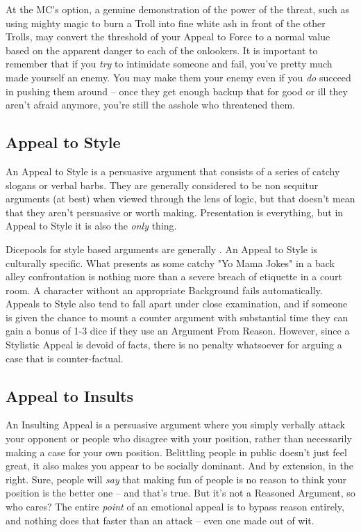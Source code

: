 At the MC's option, a genuine demonstration of the power of the threat, such as using mighty magic to burn a Troll into fine white ash in front of the other Trolls, may convert the threshold of your Appeal to Force to a normal value based on the apparent danger to each of the onlookers. It is important to remember that if you \textit{try} to intimidate someone and fail, you've pretty much made yourself an enemy. You may make them your enemy even if you \textit{do} succeed in pushing them around -- once they get enough backup that for good or ill they aren't afraid anymore, you're still the asshole who threatened them.

\subsection{Appeal to Style}

An Appeal to Style is a persuasive argument that consists of a series of catchy slogans or verbal barbs. They are generally considered to be non sequitur arguments (at best) when viewed through the lens of logic, but that doesn't mean that they aren't persuasive or worth making. Presentation is everything, but in Appeal to Style it is also the \textit{only} thing.

Dicepools for style based arguments are generally . An Appeal to Style is culturally specific. What presents as some catchy "Yo Mama Jokes" in a back alley confrontation is nothing more than a severe breach of etiquette in a court room. A character without an appropriate Background fails automatically. Appeals to Style also tend to fall apart under close examination, and if someone is given the chance to mount a counter argument with substantial time they can gain a bonus of 1-3 dice if they use an Argument From Reason. However, since a Stylistic Appeal is devoid of facts, there is no penalty whatsoever for arguing a case that is counter-factual.

\subsection{Appeal to Insults}

An Insulting Appeal is a persuasive argument where you simply verbally attack your opponent or people who disagree with your position, rather than necessarily making a case for your own position. Belittling people in public doesn't just feel great, it also makes you appear to be socially dominant. And by extension, in the right. Sure, people will \textit{say} that making fun of people is no reason to think your position is the better one -- and that's true. But it's not a Reasoned Argument, so who cares? The entire \textit{point} of an emotional appeal is to bypass reason entirely, and nothing does that faster than an attack -- even one made out of wit.

